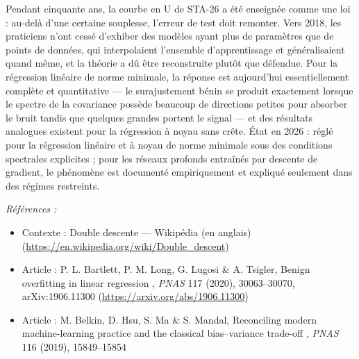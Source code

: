 \documentclass[11pt]{article}
\newenvironment{refs}{\par\small\noindent\emph{Références :}\begin{itemize}\setlength\itemsep{0pt}}{\end{itemize}\normalsize}
\begin{document}
\noindent Pendant cinquante ans, la courbe en U de STA-26 a été enseignée comme une loi :
au-delà d'une certaine souplesse, l'erreur de test doit remonter. Vers 2018, les praticiens n'ont
cessé d'exhiber des modèles ayant plus de paramètres que de points de données, qui interpolaient
l'ensemble d'apprentissage et généralisaient quand même, et la théorie a dû être reconstruite plutôt
que défendue. Pour la régression linéaire de norme minimale, la réponse est aujourd'hui
essentiellement complète et quantitative --- le surajustement bénin se produit exactement lorsque le
spectre de la covariance possède beaucoup de directions petites pour absorber le bruit tandis que
quelques grandes portent le signal --- et des résultats analogues existent pour la régression à noyau
sans crête. État en 2026 : réglé pour la régression linéaire et à noyau de norme minimale sous des
conditions spectrales explicites ; pour les réseaux profonds entraînés par descente de gradient, le
phénomène est documenté empiriquement et expliqué seulement dans des régimes restreints.

\begin{refs}
\item Contexte : Double descente --- Wikipédia (en anglais) (\url{https://en.wikipedia.org/wiki/Double_descent})
\item Article : P. L. Bartlett, P. M. Long, G. Lugosi \& A. Tsigler, \og{} Benign overfitting in linear regression \fg{}, \textit{PNAS} 117 (2020), 30063--30070, arXiv:1906.11300 (\url{https://arxiv.org/abs/1906.11300})
\item Article : M. Belkin, D. Hsu, S. Ma \& S. Mandal, \og{} Reconciling modern machine-learning practice and the classical bias--variance trade-off \fg{}, \textit{PNAS} 116 (2019), 15849--15854
\end{refs}

\bigskip
\end{document}
